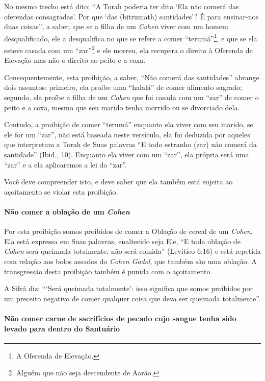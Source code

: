 No mesmo trecho está dito: ``A Torah poderia ter dito `Ela não comerá
das oferendas consagradas'. Por que `das (bitrumath) santidades'? É para
ensinar-nos duas coisas'', a saber, que se a filha de um \textit{Cohen} viver
com um homem desqualificado, ele a desqualifica no que se refere a comer
``terumá''\footnote{A Oferenda de Elevação.}, e que se ela esteve casada com um
``zar''\footnote{Alguém que não seja descendente de Aarão.} e ele morreu, ela recupera o direito à
Oferenda de Elevação mas não o direito ao peito e a coxa.
 
Consequentemente, esta proibição, a saber, ``Não comerá das santidades''
abrange dois assuntos: primeiro, ela proíbe uma ``halalá'' de comer
alimento sagrado; segundo, ela proíbe a filha de um \textit{Cohen} que foi
casada com um ``zar'' de comer o peito e a coxa, mesmo que seu marido
tenha morrido ou se divorciado dela.

Contudo, a proibição de comer ``terumá'' enquanto ela viver com seu
marido, se ele for um ``zar'', não está baseada neste versículo, ela foi
deduzida por aqueles que interpretam a Torah de Suas palavras ``E todo
estranho (zar) não comerá da santidade'' (Ibid., 10). Enquanto ela viver
com um ``zar'', ela própria será uma ``zar'' e a ela aplicaremos a lei
do ``zar''.

Você deve compreender isto, e deve saber que ela também está sujeita ao
açoitamento se violar esta proibição.

\paragraph{Não comer a oblação de um \textit{Cohen}}

Por esta proibição somos proibidos de comer a Oblação de cereal de um
\textit{Cohen}. Ela está expressa em Suas palavras, enaltecido seja Ele, ``E
toda oblação de \textit{Cohen} será queimada totalmente, não será comida''
(Levítico 6:16) e está repetida com relação aos bolos assados do \textit{Cohen
Gadol}, que também são uma oblação. A transgressão desta proibição
também é punida com o açoitamento.

A Sifrá diz: ```Será queimada totalmente': isso significa que somos
proibidos por um preceito negativo de comer qualquer coisa que deva ser
queimada totalmente''.

\paragraph{Não comer carne de sacrifícios de pecado cujo sangue tenha sido
levado para dentro do Santuário}

